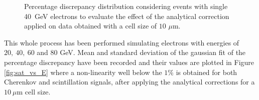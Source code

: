 \begin{figure}
	\centering
	 \quad
	\caption{Percentage discrepancy distribution considering events with single 40~GeV electrons to evaluate the effect of the analytical correction applied on data obtained with a cell size of $10$ $\mu$m.}
		\label{fig:sat_corr_perc}
\end{figure}

This whole process has been performed simulating electrons with energies of $20,\ 40,\ 60$ and $80$ GeV. Mean and standard deviation of the gaussian fit of the percentage discrepancy have been recorded and their values are plotted in Figure \ref{fig:sat_vs_E} where a non-linearity well below the $1\%$ is obtained for both Cherenkov and scintillation signals, after applying the analytical corrections for a $10~\mu$m cell size.\\


